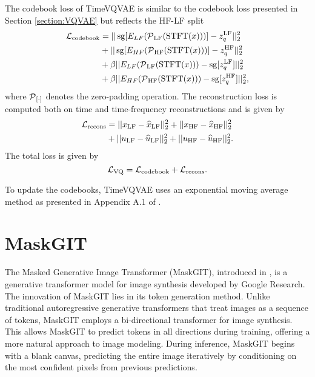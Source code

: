 \documentclass[../../thesis.tex]{subfiles}
\begin{document}
The codebook loss of TimeVQVAE is similar to the codebook loss presented in Section \ref{section:VQVAE} but reflects the HF-LF split
\begin{equation}
    \label{eq:TimeVQVAE_codebook}
    \begin{aligned}
        \mathcal{L}_\text{codebook} &= ||\operatorname{sg}[E_{LF}(\operatorname{\mathcal{P}}_{\mathrm{LF}}(\operatorname{\mathrm{STFT}}(x)))] - z_q^{\mathrm{LF}} ||_2^2 \\
                              &+ ||\operatorname{sg}[E_{HF}(\operatorname{\mathcal{P}}_{\mathrm{HF}}(\operatorname{\mathrm{STFT}}(x)))] - z_q^{\mathrm{HF}} ||_2^2 \\
                              &+ \beta||E_{LF}(\operatorname{\mathcal{P}}_{\mathrm{LF}}(\operatorname{\mathrm{STFT}}(x))) - \operatorname{sg}[z_q^{\mathrm{LF}}]||_2^2 \\
                              &+ \beta||E_{HF}(\operatorname{\mathcal{P}}_{\mathrm{HF}}(\operatorname{\mathrm{STFT}}(x))) - \operatorname{sg}[z_q^{\mathrm{HF}}]||_2^2,
    \end{aligned}
\end{equation}
where $\operatorname{\mathcal{P}}_{[\cdot]}$ denotes the zero-padding operation. 
The reconstruction loss is computed both on time and time-frequency reconstructions and is given by
\begin{equation}
    \label{eq:TimeVQVAE_recons}
    \begin{aligned}
        \mathcal{L}_\text{recons} &= ||x_{\mathrm{LF}} - \widehat{x}_{\mathrm{LF}} ||_2^2 + ||x_{\mathrm{HF}} - \widehat{x}_{\mathrm{HF}} ||_2^2\\
                              &+ ||u_{\mathrm{LF}} - \widehat{u}_{\mathrm{LF}} ||_2^2 + ||u_{\mathrm{HF}} - \widehat{u}_{\mathrm{HF}} ||_2^2.
    \end{aligned}
\end{equation}
The total loss is given by 
\begin{equation}
    \label{eq:TimeVQVAE_loss}
    \mathcal{L}_\text{VQ} = \mathcal{L}_\text{codebook} + \mathcal{L}_\text{recons}.
\end{equation}

To update the codebooks, TimeVQVAE uses an exponential moving average method as presented in Appendix A.1 of \cite{VQVAE}.


\section{MaskGIT}

The Masked Generative Image Transformer (MaskGIT), introduced in \cite{chang2022maskgit}, is a generative transformer model for image synthesis developed by Google Research. The innovation of MaskGIT lies in its token generation method. Unlike traditional autoregressive generative transformers that treat images as a sequence of tokens, MaskGIT employs a bi-directional transformer for image synthesis. This allows MaskGIT to predict tokens in all directions during training, offering a more natural approach to image modeling. During inference, MaskGIT begins with a blank canvas, predicting the entire image iteratively by conditioning on the most confident pixels from previous predictions.\newline
\end{document}

